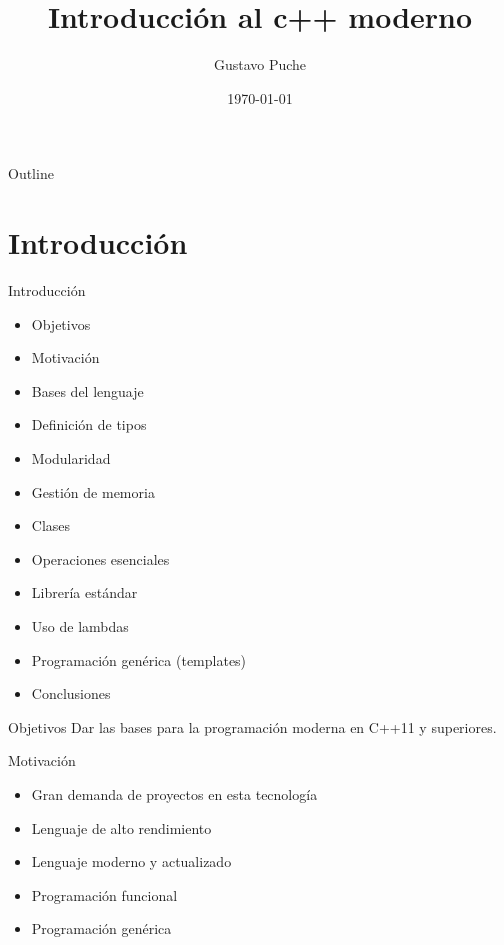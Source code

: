 \documentclass[aspectratio=169,presentation]{beamer}
\author{Gustavo Puche}
\date{\today}
\title{Introducción al c++ moderno}
\begin{document}
\maketitle
\begin{frame}{Outline}
\tableofcontents
\end{frame}

\section{Introducción}
\label{sec:orgd3c494d}
\begin{frame}[label={sec:org89aa207}]{Introducción}
\begin{itemize}
\item Objetivos
\item Motivación
\item Bases del lenguaje
\item Definición de tipos
\item Modularidad
\item Gestión de memoria
\item Clases
\item Operaciones esenciales
\item Librería estándar
\item Uso de lambdas
\item Programación genérica (templates)
\item Conclusiones
\end{itemize}
\end{frame}
\begin{frame}[label={sec:org4612eaa}]{Objetivos}
Dar las bases para la programación moderna en C++11 y superiores.
\end{frame}
\begin{frame}[label={sec:orge2f4ecd}]{Motivación}
\begin{itemize}
\item Gran demanda de proyectos en esta tecnología
\item Lenguaje de alto rendimiento
\item Lenguaje moderno y actualizado
\item Programación funcional
\item Programación genérica
\end{itemize}
\end{frame}
\end{document}
